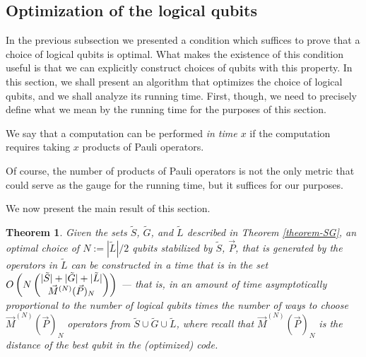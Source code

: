\documentclass[twocolumn,showpacs,preprintnumbers,amsmath,amssymb,nofootinbib,pra,floatfix]{revtex4-1}
\newtheorem{theorem}{Theorem}
\newenvironment{definition}[1][Definition]{\begin{trivlist}
\item[\hskip \labelsep {\bfseries #1}]}{\end{trivlist}}
\newcommand{\lst}{\vec}
\newcommand{\set}{\tilde}
\begin{document}
\subsection{Optimization of the logical qubits}

\label{optimization}

In the previous subsection we presented a condition which suffices to prove that a choice of logical qubits is optimal.  What makes the existence of this condition useful is that we can explicitly construct choices of qubits with this property.  In this section, we shall present an algorithm that optimizes the choice of logical qubits, and we shall analyze its running time.  First, though, we need to precisely define what we mean by the running time for the purposes of this section.

\begin{definition}
We say that a computation can be performed \emph{in time $x$} if the computation requires taking $x$ products of Pauli operators.
\end{definition}

Of course, the number of products of Pauli operators is not the only metric that could serve as the gauge for the running time, but it suffices for our purposes.

We now present the main result of this section.

\begin{theorem}
Given the sets $\set S$, $\set G$, and $\set L$ described in Theorem \ref{theorem-SG}, an optimal choice of $N:=|\set L|/2$ qubits stabilized by $\set S$, $\lst P$, that is generated by the operators in $\set L$ can be constructed in a time that is in the set $O\paren{N\choose{|\set S|+|\set G|+|\set L|}{\lst M^{(N)}(\lst P)_N}}$ --- that is, in an amount of time asymptotically proportional to the number of logical qubits times the number of ways to choose $\lst M^{(N)}(\lst P)_N$ operators from $\set S \cup \set G \cup \set L$, where recall that $\lst M^{(N)}(\lst P)_N$ is the distance of the best qubit in the (optimized) code.
\end{theorem}
\end{document}
